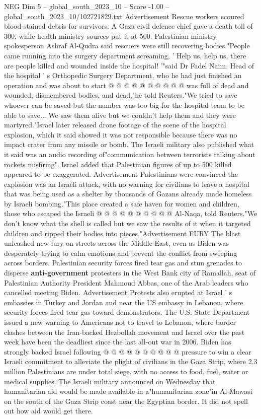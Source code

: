 \begin{textsample}{NEG Dim 5 – global\_south\_2023\_10 – Score -1.00 – global\_south\_2023\_10/102721829.txt}
Advertisement Rescue workers scoured blood-stained debris for survivors.
A Gaza civil defence chief gave a death toll of 300, while health ministry sources put it at 500.
Palestinian ministry spokesperson Ashraf Al-Qudra said rescuers were still recovering bodies."People came running into the surgery department screaming, ' Help us, help us, there are people killed and wounded inside the hospital! '"said Dr Fadel Naim, Head of the hospital ' s Orthopedic Surgery Department, who he had just finished an operation and was about to start @ @ @ @ @ @ @ @ @ @ was full of dead and wounded, dismembered bodies, and dead,"he told Reuters."We tried to save whoever can be saved but the number was too big for the hospital team to be able to save...
We saw them alive but we couldn't help them and they were martyred."Israel later released drone footage of the scene of the hospital explosion, which it said showed it was not responsible because there was no impact crater from any missile or bomb.
The Israeli military also published what it said was an audio recording of"communication between terrorists talking about rockets misfiring".
Israel added that Palestinian figures of up to 500 killed appeared to be exaggerated.
Advertisement Palestinians were convinced the explosion was an Israeli attack, with no warning for civilians to leave a hospital that was being used as a shelter by thousands of Gazans already made homeless by Israeli bombing."This place created a safe haven for women and children, those who escaped the Israeli @ @ @ @ @ @ @ @ @ @ Al-Naqa, told Reuters."We don't know what the shell is called but we saw the results of it when it targeted children and ripped their bodies into pieces."Advertisement FURY The blast unleashed new fury on streets across the Middle East, even as Biden was desperately trying to calm emotions and prevent the conflict from sweeping across borders.
Palestinian security forces fired tear gas and stun grenades to disperse \textbf{anti-government} protesters in the West Bank city of Ramallah, seat of Palestinian Authority President Mahmoud Abbas, one of the Arab leaders who cancelled meeting Biden.
Advertisement Protests also erupted at Israel ' s embassies in Turkey and Jordan and near the US embassy in Lebanon, where security forces fired tear gas toward demonstrators.
The U.S.
State Department issued a new warning to Americans not to travel to Lebanon, where border clashes between the Iran-backed Hezbollah movement and Israel over the past week have been the deadliest since the last all-out war in 2006.
Biden has strongly backed Israel following @ @ @ @ @ @ @ @ @ @ pressure to win a clear Israeli commitment to alleviate the plight of civilians in the Gaza Strip, where 2.3 million Palestinians are under total siege, with no access to food, fuel, water or medical supplies.
The Israeli military announced on Wednesday that humanitarian aid would be made available in a"humanitarian zone"in Al-Mawasi on the south of the Gaza Strip coast near the Egyptian border.
It did not spell out how aid would get there.

\end{textsample}

